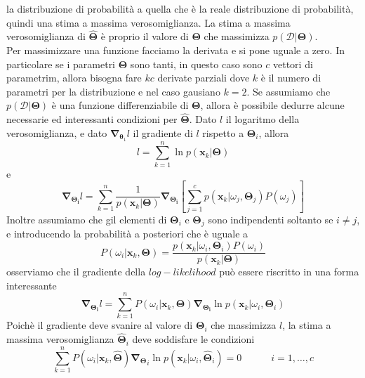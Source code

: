 la distribuzione di probabilità a quella che è la reale distribuzione di probabilità, quindi una stima a massima verosomiglianza. La stima a massima verosomiglianza  di $\mathbf{\hat{\Theta}}$ è proprio il valore di $\mathbf{\Theta}$ che massimizza $p(\mathcal{D}|\mathbf{\Theta})$.\\
Per massimizzare una funzione facciamo la derivata e si pone uguale a zero. In particolare se i parametri $\mathbf{\Theta}$ sono tanti, in questo caso sono $c$ vettori di parametrim, allora bisogna fare $kc$ derivate parziali dove $k$ è il numero di parametri per la distribuzione e nel caso gausiano $k=2$. 
Se assumiamo che $p(\mathcal{D}|\mathbf{\Theta})$ è una funzione differenziabile di $\mathbf{\Theta}$, allora è possibile dedurre alcune necessarie ed interessanti condizioni per $\mathbf{\hat{\Theta}}$. Dato $l$ il logaritmo della verosomiglianza, e dato $\mathbf{\nabla}_{\mathbf{\theta}_1}l$ il gradiente di $l$ rispetto a $\mathbf{\Theta}_i$, allora
\begin{equation}
l= \sum_{k=1}^n \ln p(\mathbf{x}_k|\mathbf{\Theta})
\end{equation}
e
\begin{equation}
\mathbf{\nabla_{\Theta_i}} l = \sum_{k=1}^n \frac{1}{p(\mathbf{x}_k|\mathbf{\Theta})} \mathbf{\nabla_{\Theta_i}} \left[ \sum_{j=1}^c p(\mathbf{x}_k| \omega_j, \mathbf{\Theta}_j) P(\omega_j) \right]
\end{equation}
Inoltre assumiamo che gil elementi di $\mathbf{\Theta}_i$ e $\mathbf{\Theta}_j$ sono indipendenti soltanto se $i \neq j$, e introducendo la probabilità a posteriori che è uguale a
\begin{equation}
P(\omega_i|\mathbf{x}_k, \mathbf{\Theta}) = \frac{p(\mathbf{x}_k|\omega_i, \mathbf{\Theta}_i)P(\omega_i)}{p(\mathbf{x}_k|\mathbf{\Theta})}
\end{equation}
osserviamo che il gradiente della $log-likelihood$ può essere riscritto in una forma interessante
\begin{equation}
\mathbf{\nabla_{\Theta_i}} l = \sum_{k=1}^n P(\omega_i|\mathbf{x}_k, \mathbf{\Theta}) \mathbf{\nabla_{\mathbf{\Theta}_i}} \ln p(\mathbf{x}_k|\omega_i, \mathbf{\Theta}_i)
\end{equation}
Poichè il gradiente deve svanire al valore di $\mathbf{\Theta}_i$ che massimizza $l$, la stima a massima verosomiglianza $\mathbf{\hat{\Theta}}_i$ deve soddisfare le condizioni
\begin{equation}\label{8}
\sum_{k=1}^n P(\omega_i|\mathbf{x}_k, \mathbf{\hat{\Theta}}) \mathbf{\nabla_{\Theta}}_i \ln p(\mathbf{x}_k|\omega_i, \mathbf{\hat{\Theta}}_i) = 0 \quad \quad \quad i=1, \dots, c
\end{equation}
